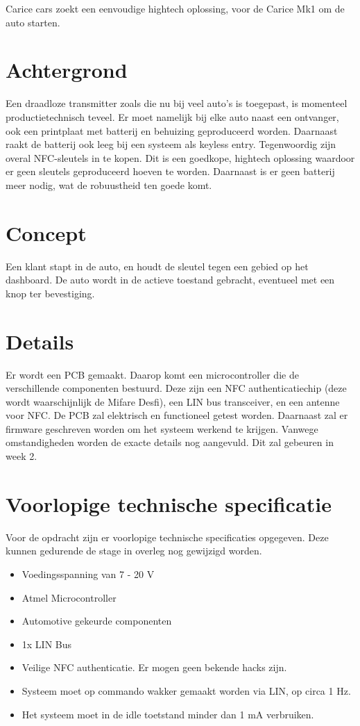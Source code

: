 Carice cars zoekt een eenvoudige hightech oplossing, voor de Carice Mk1 om de auto starten. \newline
\section{Achtergrond}
Een draadloze transmitter zoals die nu bij veel auto's is toegepast, is momenteel productietechnisch teveel. Er moet namelijk bij elke auto naast een ontvanger, ook een printplaat met batterij en behuizing geproduceerd worden. Daarnaast raakt de batterij ook leeg bij een systeem als keyless entry. \newline
Tegenwoordig zijn overal NFC-sleutels in te kopen. Dit is een goedkope, hightech oplossing waardoor er geen sleutels geproduceerd hoeven te worden. 
Daarnaast is er geen batterij meer nodig, wat de robuustheid ten goede komt.

\section{Concept}
Een klant stapt in de auto, en houdt de sleutel tegen een gebied op het dashboard. De auto wordt in de actieve toestand gebracht, eventueel met een knop ter bevestiging.

\section{Details}
Er wordt een PCB gemaakt. Daarop komt een microcontroller die de verschillende componenten bestuurd. Deze zijn een NFC authenticatiechip (deze wordt waarschijnlijk de Mifare Desfi), een LIN bus transceiver, en een antenne voor NFC. 
De PCB zal elektrisch en functioneel getest worden.
Daarnaast zal er firmware geschreven worden om het systeem werkend te krijgen.
Vanwege omstandigheden worden de exacte details nog aangevuld. Dit zal gebeuren in week 2.

\section{Voorlopige technische specificatie}

Voor de opdracht zijn er voorlopige technische specificaties opgegeven. Deze kunnen gedurende de stage in overleg nog gewijzigd worden.


\begin{itemize}
	\item Voedingsspanning van 7 - 20 V
	\item Atmel Microcontroller
	\item Automotive gekeurde componenten
	\item 1x LIN Bus
	\item Veilige NFC authenticatie. Er mogen geen bekende hacks zijn.
	\item Systeem moet op commando wakker gemaakt worden via LIN, op circa 1 Hz.
	\item Het systeem moet in de idle toetstand minder dan 1 mA verbruiken.
\end{itemize}


